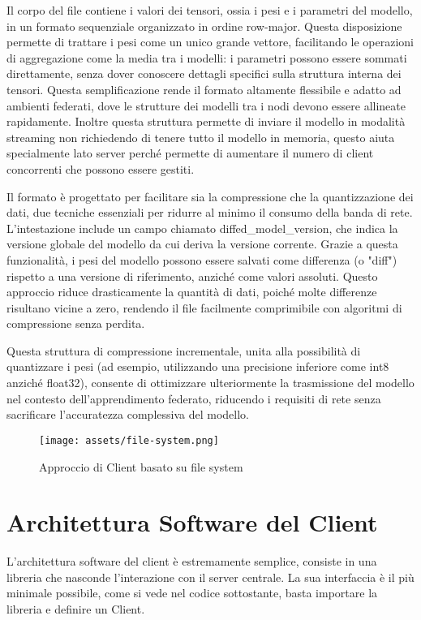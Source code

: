 \documentclass[a4paper, oneside, openright]{report}
\let\oldsection\section
\renewcommand{\section}{\newpage\oldsection}
\begin{document}
Il corpo del file contiene i valori dei tensori, ossia i pesi e i parametri del modello, in un formato sequenziale organizzato in ordine row-major. Questa disposizione permette di trattare i pesi come un unico grande vettore, facilitando le operazioni di aggregazione come la media tra i modelli: i parametri possono essere sommati direttamente, senza dover conoscere dettagli specifici sulla struttura interna dei tensori. Questa semplificazione rende il formato altamente flessibile e adatto ad ambienti federati, dove le strutture dei modelli tra i nodi devono essere allineate rapidamente. Inoltre questa struttura permette di inviare il modello in modalità streaming non richiedendo di tenere tutto il modello in memoria, questo aiuta specialmente lato server perché permette di aumentare il numero di client concorrenti che possono essere gestiti.

Il formato è progettato per facilitare sia la compressione che la quantizzazione dei dati, due tecniche essenziali per ridurre al minimo il consumo della banda di rete. L'intestazione include un campo chiamato diffed\_model\_version, che indica la versione globale del modello da cui deriva la versione corrente. Grazie a questa funzionalità, i pesi del modello possono essere salvati come differenza (o "diff") rispetto a una versione di riferimento, anziché come valori assoluti. Questo approccio riduce drasticamente la quantità di dati, poiché molte differenze risultano vicine a zero, rendendo il file facilmente comprimibile con algoritmi di compressione senza perdita.

Questa struttura di compressione incrementale, unita alla possibilità di quantizzare i pesi (ad esempio, utilizzando una precisione inferiore come int8 anziché float32), consente di ottimizzare ulteriormente la trasmissione del modello nel contesto dell’apprendimento federato, riducendo i requisiti di rete senza sacrificare l'accuratezza complessiva del modello.

 
\newpage
\begin{figure}[t]
\centering
\texttt{[image: assets/file-system.png]}
\caption{Approccio di Client basato su file system}\label{fig:file-system}
\end{figure}

\section{Architettura Software del Client}
L'architettura software del client è estremamente semplice, consiste in una libreria che nasconde l'interazione con il server centrale.  La sua interfaccia è il più minimale possibile, come si vede nel codice sottostante, basta importare la libreria e definire un Client. 
\end{document}

